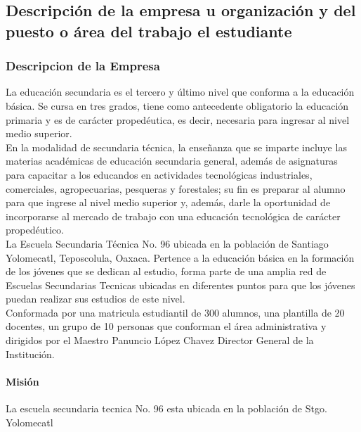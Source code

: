 \subsection{Descripción de la empresa u organización y del puesto o área del trabajo el estudiante}

\subsubsection{Descripcion de la Empresa}

{\large La educación secundaria es el tercero y último nivel que conforma a la educación básica. Se cursa en tres grados, tiene como antecedente obligatorio la educación primaria y es de carácter propedéutica, es decir, necesaria para ingresar al nivel medio superior.}\\

{\large En la modalidad de secundaria técnica, la enseñanza que se imparte incluye las materias académicas de educación secundaria general, además de asignaturas para capacitar a los educandos en actividades tecnológicas industriales, comerciales, agropecuarias, pesqueras y forestales; su fin es preparar al alumno para que ingrese al nivel medio superior y, además, darle la oportunidad de incorporarse al mercado de trabajo con una educación tecnológica de carácter propedéutico.}\\

{\large La Escuela Secundaria Técnica No. 96 ubicada en la población de Santiago Yolomecatl, Teposcolula, Oaxaca. Pertence a la educación básica en la formación de los jóvenes que se dedican al estudio, forma parte de una amplia red de Escuelas Secundarias Tecnicas ubicadas en diferentes puntos para que los jóvenes puedan realizar sus estudios de este nivel. }\\

{\large Conformada por una matricula estudiantil de 300 alumnos, una plantilla de 20 docentes, un grupo de 10 personas que conforman el área administrativa y dirigidos por el Maestro Panuncio López Chavez Director General de la Institución.}\\

\paragraph{Misión}

{\large La escuela secundaria tecnica No. 96 esta ubicada en la población de Stgo. Yolomecatl}\\

